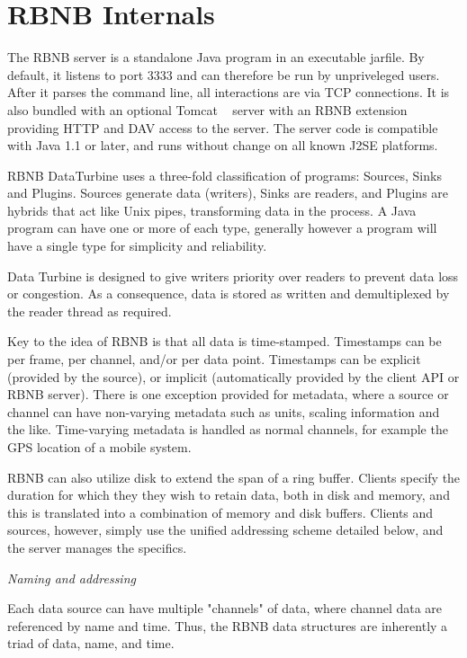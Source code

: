 \section{RBNB Internals}\label{sec:rbnb-internals}

The RBNB server is a standalone Java program in an executable jarfile. By default, it listens to port 3333 and can therefore be run by unpriveleged users. After it parses the command line, all interactions are via TCP connections. It is also bundled with an optional Tomcat ~\cite{tomcat-project} server with an RBNB extension providing HTTP and DAV access to the server. The server code is compatible with Java 1.1 or later, and runs without change on all known J2SE platforms.

RBNB DataTurbine uses a three-fold classification of programs: Sources, Sinks and Plugins. Sources generate data (writers), Sinks are readers, and Plugins are hybrids that act like Unix pipes, transforming data in the process. A Java program can have one or more of each type, generally however a program will have a single type for simplicity and reliability. 

Data Turbine is designed to give writers priority over readers to prevent data loss or congestion. As a consequence, data is stored as written and demultiplexed by the reader thread as required. 

Key to the idea of RBNB is that all data is time-stamped.  Timestamps can be per frame, per channel, and/or per data point.  Timestamps can be explicit (provided by the source), or implicit (automatically provided by the client API or RBNB server). There is one exception provided for metadata, where a source or channel can have non-varying metadata such as units, scaling information and the like. Time-varying metadata is handled as normal channels, for example the GPS location of a mobile system.

RBNB can also utilize disk to extend the span of a ring buffer. Clients specify the duration for which they they wish to retain data, both in disk and memory, and this is translated into a combination of memory and disk buffers. Clients and sources, however, simply use the unified addressing scheme detailed below, and the server manages the specifics.

\emph{Naming and addressing}

Each data source can have multiple "channels" of data, where channel data are referenced by name and time. Thus, the RBNB data structures are inherently a triad of data, name, and time.  

